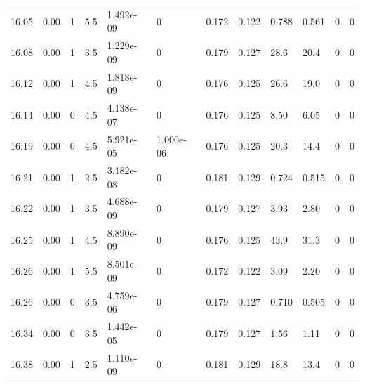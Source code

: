\documentclass[preview]{standalone}
\begin{document}
{{{{{{{{{{{{{{{\begin{tabular}{L{1.2cm}C{1.2cm} C{0.3cm}C{0.5cm} C{1.4cm}C{1.4cm} C{1.4cm}C{1.4cm} C{1.6cm}C{1.6cm} C{1.6cm}C{1.6cm}}
  16.05  &  0.00  & 1     & 5.5 &  1.492e-09  & 0  &  0.172&   0.122& 0.788 & 0.561   &  0 & 0  \\ 
  16.08  &  0.00  & 1     & 3.5 &  1.229e-09  & 0  &  0.179&   0.127& 28.6 & 20.4   &  0 & 0  \\ 
  16.12  &  0.00  & 1     & 4.5 &  1.818e-09  & 0  &  0.176&   0.125& 26.6 & 19.0   &  0 & 0  \\ 
  16.14  &  0.00  & 0     & 4.5 &  4.138e-07  & 0  &  0.176&   0.125& 8.50 & 6.05   &  0 & 0  \\ 
  16.19  &  0.00  & 0     & 4.5 &  5.921e-05  & 1.000e-06  &  0.176&   0.125& 20.3 & 14.4   &  0 & 0  \\ 
  16.21  &  0.00  & 1     & 2.5 &  3.182e-08  & 0  &  0.181&   0.129& 0.724 & 0.515   &  0 & 0  \\ 
  16.22  &  0.00  & 1     & 3.5 &  4.688e-09  & 0  &  0.179&   0.127& 3.93 & 2.80   &  0 & 0  \\ 
  16.25  &  0.00  & 1     & 4.5 &  8.890e-09  & 0  &  0.176&   0.125& 43.9 & 31.3   &  0 & 0  \\ 
  16.26  &  0.00  & 1     & 5.5 &  8.501e-09  & 0  &  0.172&   0.122& 3.09 & 2.20   &  0 & 0  \\ 
  16.26  &  0.00  & 0     & 3.5 &  4.759e-06  & 0  &  0.179&   0.127& 0.710 & 0.505   &  0 & 0  \\ 
  16.34  &  0.00  & 0     & 3.5 &  1.442e-05  & 0  &  0.179&   0.127& 1.56 & 1.11   &  0 & 0  \\ 
  16.38  &  0.00  & 1     & 2.5 &  1.110e-09  & 0  &  0.181&   0.129& 18.8 & 13.4   &  0 & 0  \\ 
\hline 
\end{tabular} 

}}}}}}}}}}}}}}}
\end{document}
